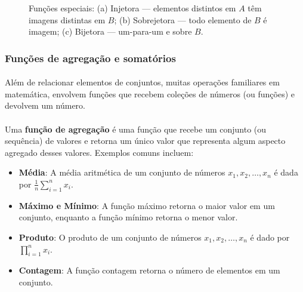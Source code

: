 \documentclass[12pt,a4paper]{article}
\def\emph#1{#1}%
\begin{document}
\begin{figure}[H]
\caption{Funções especiais: (a) Injetora — elementos distintos em $A$ têm imagens distintas em $B$; (b) Sobrejetora — todo elemento de $B$ é imagem; (c) Bijetora — um-para-um e sobre $B$.}
\label{fig:inj-sobre-bij}
\end{figure}

\subsubsection{Funções de agregação e somatórios}

\paragraph{}
Além de relacionar elementos de conjuntos, muitas operações familiares em matemática, envolvem \emph{funções} que recebem coleções de números (ou funções) e devolvem um número.

\paragraph{}
Uma \textbf{função de agregação} é uma função que recebe um conjunto (ou sequência) de valores e retorna um único valor que representa algum aspecto agregado desses valores. Exemplos comuns incluem:
\begin{itemize}
    \item \textbf{Média}: A média aritmética de um conjunto de números \(x_1, x_2, \ldots, x_n\) é dada por \(\frac{1}{n}\sum_{i=1}^{n} x_i\).
    \item \textbf{Máximo e Mínimo}: A função máximo retorna o maior valor em um conjunto, enquanto a função mínimo retorna o menor valor.
    \item \textbf{Produto}: O produto de um conjunto de números \(x_1, x_2, \ldots, x_n\) é dado por \(\prod_{i=1}^{n} x_i\).
    \item \textbf{Contagem}: A função contagem retorna o número de elementos em um conjunto.
\end{itemize}
\end{document}
